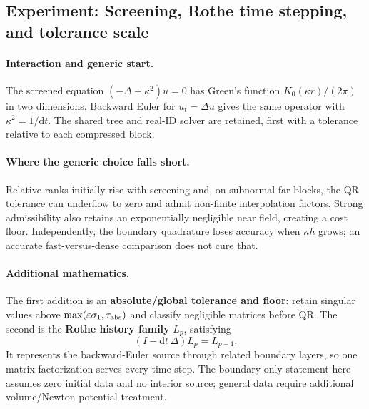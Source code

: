 \subsection{Experiment: Screening, Rothe time stepping, and tolerance scale}
\label{exp:e7}
\paragraph{Interaction and generic start.} The screened equation $(-\Delta+\kappa^2)u=0$ has Green's function $K_0(\kappa r)/(2\pi)$ in two dimensions. Backward Euler for $u_t=\Delta u$ gives the same operator with $\kappa^2=1/\mathrm dt$. The shared tree and real-ID solver are retained, first with a tolerance relative to each compressed block.

\paragraph{Where the generic choice falls short.} Relative ranks initially rise with screening and, on subnormal far blocks, the QR tolerance can underflow to zero and admit non-finite interpolation factors. Strong admissibility also retains an exponentially negligible near field, creating a cost floor. Independently, the boundary quadrature loses accuracy when $\kappa h$ grows; an accurate fast-versus-dense comparison does not cure that.

\paragraph{Additional mathematics.} The first addition is an \textbf{absolute/global tolerance and floor}: retain singular values above $\max(\varepsilon\sigma_1,\tau_{\rm abs})$ and classify negligible matrices before QR. The second is the \textbf{Rothe history family} $L_p$, satisfying
\[
 (I-\mathrm dt\,\Delta)L_p=L_{p-1}.
\]
It represents the backward-Euler source through related boundary layers, so one matrix factorization serves every time step. The boundary-only statement here assumes zero initial data and no interior source; general data require additional volume/Newton-potential treatment.

